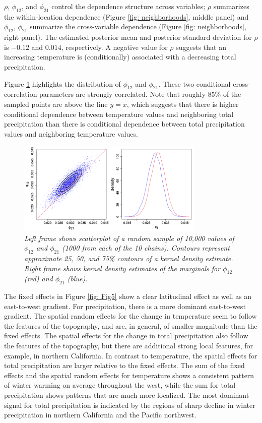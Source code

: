\documentclass[12pt]{amsart}
\begin{document}
$\rho$, $\phi_{12}$, and $\phi_{21}$ control the dependence structure across variables; $\rho$ summarizes the within-location dependence (Figure \ref{fig: neighborhoods}, middle panel) and $\phi_{12}$, $\phi_{21}$ summarize the cross-variable dependence (Figure \ref{fig: neighborhoods}, right panel). The estimated posterior mean and posterior standard deviation for $\rho$ is $-0.12$ and $0.014$, respectively. A negative value for $\rho$ suggests that an increasing temperature is (conditionally) associated with a decreasing total precipitation.

Figure \ref{fig: Fig4} highlights the distribution of $\phi_{12}$ and $\phi_{21}$. These two conditional cross-correlation parameters are strongly correlated. Note that roughly 85\% of the sampled points are above the line $y = x$, which suggests that there is higher conditional dependence between temperature values and neighboring total precipitation than there is conditional dependence between total precipitation values and neighboring temperature values.

\begin{figure}[H]
    \centering
    \includegraphics[width = 0.8\textwidth]{Fig4.png}
    \caption{\emph{Left frame shows scatterplot of a random sample of 10,000 values of $\phi_{12}$ and $\phi_{21}$ (1000 from each of the 10 chains). Contours represent approximate 25, 50, and 75\% contours of a kernel density estimate. Right frame shows kernel density estimates of the marginals for $\phi_{12}$ (red) and $\phi_{21}$ (blue).}}
    \label{fig: Fig4}
\end{figure}

The fixed effects in Figure \ref{fig: Fig5} show a clear latitudinal effect as well as an east-to-west gradient. For precipitation, there is a more dominant east-to-west gradient. The spatial random effects for the change in temperature seem to follow the features of the topography, and are, in general, of smaller magnitude than the fixed effects. The spatial effects for the change in total precipitation also follow the features of the topography, but there are additional strong local features, for example, in northern California. In contrast to temperature, the spatial effects for total precipitation are larger relative to the fixed effects. The sum of the fixed effects and the spatial random effects for temperature shows a consistent pattern of winter warming on average throughout the west, while the sum for total precipitation shows patterns that are much more localized. The most dominant signal for total precipitation is indicated by the regions of sharp decline in winter precipitation in northern California and the Pacific northwest.
\end{document}
